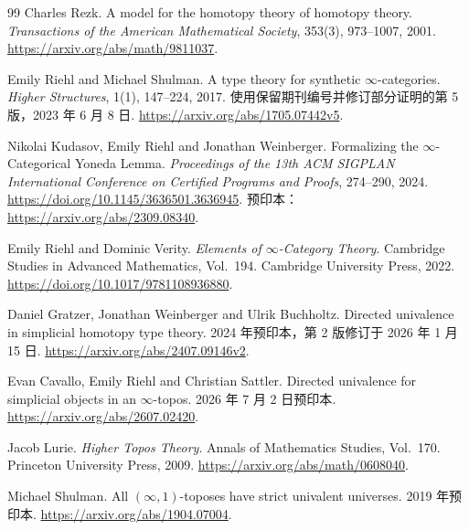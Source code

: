 \begin{thebibliography}{99}
Charles Rezk.
A model for the homotopy theory of homotopy theory.
\emph{Transactions of the American Mathematical Society}, 353(3), 973--1007, 2001.
\url{https://arxiv.org/abs/math/9811037}.

Emily Riehl and Michael Shulman.
A type theory for synthetic $\infty$-categories.
\emph{Higher Structures}, 1(1), 147--224, 2017.
使用保留期刊编号并修订部分证明的第 5 版，2023 年 6 月 8 日.
\url{https://arxiv.org/abs/1705.07442v5}.

Nikolai Kudasov, Emily Riehl and Jonathan Weinberger.
Formalizing the $\infty$-Categorical Yoneda Lemma.
\emph{Proceedings of the 13th ACM SIGPLAN International Conference on Certified Programs and Proofs}, 274--290, 2024.
\url{https://doi.org/10.1145/3636501.3636945}.
预印本：\url{https://arxiv.org/abs/2309.08340}.

Emily Riehl and Dominic Verity.
\emph{Elements of $\infty$-Category Theory}.
Cambridge Studies in Advanced Mathematics, Vol.~194. Cambridge University Press, 2022.
\url{https://doi.org/10.1017/9781108936880}.

Daniel Gratzer, Jonathan Weinberger and Ulrik Buchholtz.
Directed univalence in simplicial homotopy type theory.
2024 年预印本，第 2 版修订于 2026 年 1 月 15 日.
\url{https://arxiv.org/abs/2407.09146v2}.

Evan Cavallo, Emily Riehl and Christian Sattler.
Directed univalence for simplicial objects in an $\infty$-topos.
2026 年 7 月 2 日预印本.
\url{https://arxiv.org/abs/2607.02420}.

Jacob Lurie.
\emph{Higher Topos Theory}.
Annals of Mathematics Studies, Vol.~170. Princeton University Press, 2009.
\url{https://arxiv.org/abs/math/0608040}.

Michael Shulman.
All $(\infty,1)$-toposes have strict univalent universes.
2019 年预印本.
\url{https://arxiv.org/abs/1904.07004}.

\end{thebibliography}
